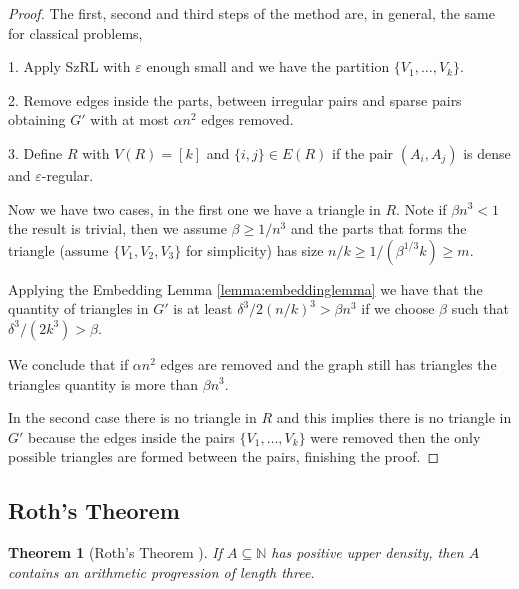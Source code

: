 \documentclass[12pt,twoside,a4paper,bibliography=totocnumbered]{book}
\numberwithin{equation}{section}
\newtheorem{theorem}             {Theorem}[section]
\theoremstyle{remark}
\begin{document}
\begin{proof}
The first, second and third steps of the method are, in general, the same for classical problems,

1. Apply SzRL with $\varepsilon$ enough small and we have the partition $\{V_1, \ldots , V_k\}$.

2. Remove edges inside the parts, between irregular pairs and sparse pairs obtaining $G'$ with at most $\alpha n^2$ edges removed.

3. Define $R$ with $V(R) = [k]$ and $\{i,j\} \in E(R) $ if  the pair $(A_i, A_j)$ is dense and $\varepsilon$-regular.

Now we have two cases, in the first one we have a triangle in $R$. Note if $\beta n^3 < 1$ the result is trivial, then we assume $\beta \geq 1/n^3$ and the parts that forms the triangle (assume $\{V_1, V_2, V_3\}$ for simplicity) has size $n/k \geq 1/(\beta ^{1/3} k) \geq m$.

Applying the Embedding Lemma \ref{lemma:embeddinglemma} we have that the quantity of triangles in $G'$ is at least $\delta ^3 /2 (n/k)^3 > \beta n^3$ if we choose $\beta$ such that $\delta ^3 / (2k^3) > \beta$.

We conclude that if $\alpha n^2$ edges are removed and the graph still has triangles the triangles quantity is more than $\beta n^3$.

In the second case there is no triangle in $R$ and this implies there is no triangle in $G'$ because the edges inside the pairs $\{V_1, \ldots , V_k\}$ were removed then the only possible triangles are formed between the pairs, finishing the proof.
\end{proof}


\subsection{Roth's Theorem}

\begin{theorem}[{Roth's Theorem \cite{Ro53}}] If $A \subseteq \mathbb{N}$ has positive upper density, then $A$ contains an arithmetic progression of length three. 
\end{theorem}
\end{document}
